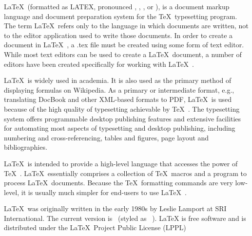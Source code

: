 
\LaTeX\ (formatted as LATEX, pronounced , , , or ), is a document markup language and document preparation system for the \TeX\ typesetting program. The term \LaTeX\ refers only to the language in which documents are written, not to the editor application used to write those documents. In order to create a document in \LaTeX\ , a .tex file must be created using some form of text editor. While most text editors can be used to create a \LaTeX\ document, a number of editors have been created specifically for working with \LaTeX\ .

\LaTeX\ is widely used in academia. It is also used as the primary method of displaying formulas on Wikipedia. As a primary or intermediate format, e.g., translating DocBook and other XML-based formats to PDF, \LaTeX\ is used because of the high quality of typesetting achievable by \TeX\ . The typesetting system offers programmable desktop publishing features and extensive facilities for automating most aspects of typesetting and desktop publishing, including numbering and cross-referencing, tables and figures, page layout and bibliographies.

\LaTeX\ is intended to provide a high-level language that accesses the power of \TeX\ . \LaTeX\ essentially comprises a collection of \TeX\ macros and a program to process \LaTeX\ documents. Because the \TeX\ formatting commands are very low-level, it is usually much simpler for end-users to use \LaTeX\ .

\LaTeX\ was originally written in the early 1980s by Leslie Lamport at SRI International. The current version is \LaTeXe\ (styled as \LaTeXe\ ). LaTeX is free software and is distributed under the \LaTeX\ Project Public License (LPPL)

\newcommand{\keywords}{\LaTeX}
